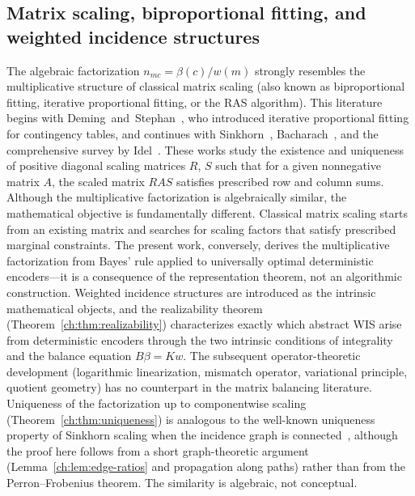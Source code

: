 \subsection*{Matrix scaling, biproportional fitting, and weighted incidence structures}
The algebraic factorization $n_{mc}=\beta(c)/w(m)$ strongly resembles
the multiplicative structure of classical matrix scaling (also known
as biproportional fitting, iterative proportional fitting, or the
RAS algorithm).  This literature begins with
Deming~and~Stephan~\cite{deming1940least}, who introduced iterative
proportional fitting for contingency tables, and continues with
Sinkhorn~\cite{sinkhorn1964relationship,sinkhorn1967concerning},
Bacharach~\cite{bacharach1970biproportional}, and the comprehensive
survey by Idel~\cite{idel2016review}.  These works study the existence
and uniqueness of positive diagonal scaling matrices $R$, $S$ such
that for a given nonnegative matrix $A$, the scaled matrix
$RAS$ satisfies prescribed row and column sums.
Although the multiplicative factorization is algebraically similar,
the mathematical objective is fundamentally different.  Classical
matrix scaling starts from an existing matrix and searches for scaling
factors that satisfy prescribed marginal constraints.  The present
work, conversely, derives the multiplicative factorization from Bayes'
rule applied to universally optimal deterministic encoders---it is a
consequence of the representation theorem, not an algorithmic
construction.  Weighted incidence structures are introduced as the
intrinsic mathematical objects, and the realizability theorem
(Theorem~\ref{ch:thm:realizability}) characterizes exactly which abstract
WIS arise from deterministic encoders through the two intrinsic
conditions of integrality and the balance equation $B\beta=Kw$.  The
subsequent operator-theoretic development (logarithmic linearization,
mismatch operator, variational principle, quotient geometry) has no
counterpart in the matrix balancing literature.
Uniqueness of the factorization up to componentwise scaling
(Theorem~\ref{ch:thm:uniqueness}) is analogous to the well-known
uniqueness property of Sinkhorn scaling when the incidence graph is
connected~\cite{sinkhorn1964relationship}, although the proof here
follows from a short graph-theoretic argument (Lemma~\ref{ch:lem:edge-ratios}
and propagation along paths) rather than from the Perron--Frobenius
theorem.  The similarity is algebraic, not conceptual.
